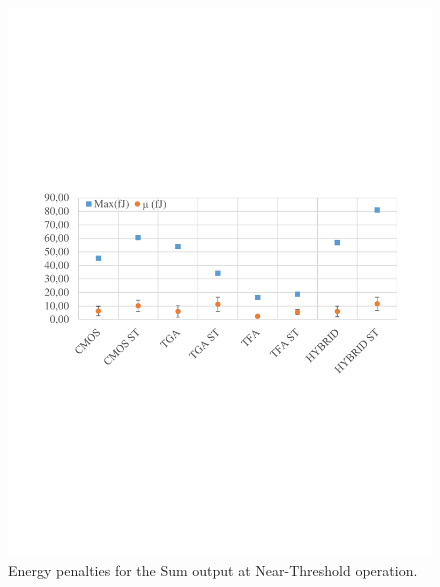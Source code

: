 \documentclass[ecp,tc, english]{iiufrgs}
\begin{document}
\begin{figure}[H]
\centering
\includegraphics[width=\textwidth, trim={0 9cm 0 9cm},clip]{energyNTSum.pdf}
\caption{Energy penalties for the Sum output at Near-Threshold operation.}
\label{fig:energyNTS}
\end{figure}
\end{document}

